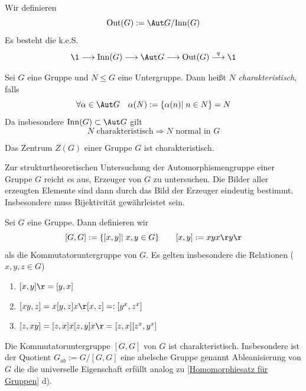 \documentclass[11pt, a4paper]{article}
\begin{document}
\begin{lemma}
Wir definieren $$\mathrm{Out}(G):= \Aut G /\mathrm{Inn}(G)$$ Es besteht die k.e.S.
$$\1 \longrightarrow \mathrm{Inn}(G) \longrightarrow \Aut G \longrightarrow \mathrm{Out}(G)\overset{q}{\longrightarrow} \1$$
\end{lemma}

\begin{definition} Sei $G$ eine Gruppe und $N\leqslant G$ eine Untergruppe. Dann heißt $N$ \emph{charakteristisch}, falls
$$\forall \alpha \in \Aut G \quad \alpha (N):= \{\alpha(n)| \; n\in N\} = N$$
Da insbesondere $\mathrm{Inn}(G) \subset \Aut G$ gilt
$$N \text{ charakteristisch} \Longrightarrow N \text{ normal in $G$}$$
\end{definition}

\begin{corollary}[Charakteristik $Z(G)$]
    Das Zentrum $Z(G)$ einer Gruppe $G$ ist charakteristisch.
\end{corollary}

\begin{note}[Tipp] Zur strukturtheoretischen Untersuchung der Automorphismengruppe einer Gruppe $G$ reicht es aus, Erzeuger von $G$ zu untersuchen. Die Bilder aller erzeugten Elemente sind dann durch das Bild der Erzeuger eindeutig bestimmt. Insbesondere muss Bijektivität gewährleistet sein.
\end{note}

\begin{definition}
Sei $G$ eine Gruppe. Dann definieren wir
$$[G,G]:=\{[x,y]|\; x,y\in G\}\qquad [x,y]:= xyx\r y\r $$
als die Kommutatoruntergruppe von $G$. Es gelten insbesondere die Relationen ($x,y,z\in G$)
\begin{enumerate}[label=\roman*)]
    \item $[x,y]\r = [y,x]$
    \item $[xy,z] = x[y,z]x\r [x,z] =: [y^x, z^x]$
    \item $[z,xy] = [z,x]x[z,y]x\r = [z,x][z^x, y^x]$
\end{enumerate}
\end{definition}

\begin{corollary}
Die Kommutatoruntergruppe $[G,G]$ von $G$ ist charakteristisch. Insbesondere ist der Quotient $G_{ab} := G/[G,G]$ eine abelsche Gruppe genannt Ableanisierung von $G$ die die universelle Eigenschaft erfüllt analog zu \ref{Homomorphiesatz für Gruppen} d).
\end{corollary}
\end{document}
